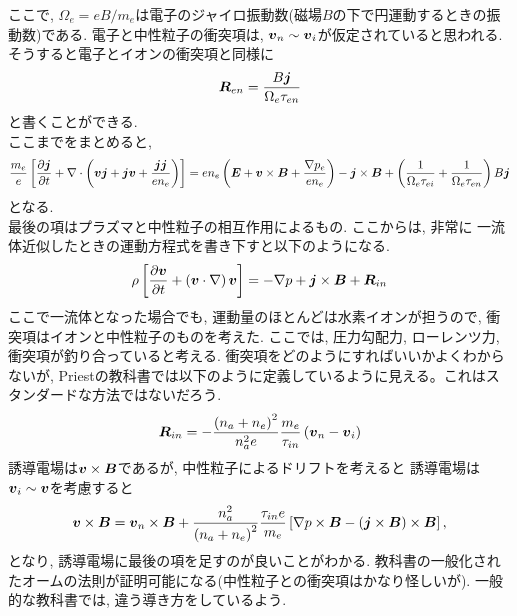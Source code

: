 \documentclass[12pt,a4j]{ltjarticle}
\newcommand{\bm}[1]{{\mbox{\boldmath $#1$}}}
\begin{document}
    ここで, $\Omega_e=eB/m_e$は電子のジャイロ振動数(磁場$B$の下で円運動するときの振動数)である.
    電子と中性粒子の衝突項は, $\bm{v}_n\sim\bm{v}_i$が仮定されていると思われる. そうすると電子とイオンの衝突項と同様に
    \begin{align}
        \bm{R}_{en} = \frac{B\bm{j}}{\Omega_e \tau_{en}}
    \end{align}
    と書くことができる.
    \\
    ここまでをまとめると,
    \begin{align}
        \frac{m_e}{e}
        \left[
        \frac{\partial\bm{j}}{\partial t} + \nabla\cdot\left(\bm{vj}+\bm{jv} + \frac{\bm{jj}}{en_e}\right)
        \right] = en_e\left(\bm{E}+\bm{v}\times\bm{B} + \frac{\nabla p_e}{en_e}\right) - \bm{j}\times\bm{B}
        +
        \left(
        \frac{1}{\Omega_e\tau_{ei}} + \frac{1}{\Omega_e\tau_{en}}
        \right)B\bm{j}
    \end{align}
    となる.\\
    最後の項はプラズマと中性粒子の相互作用によるもの. ここからは, 非常に
    一流体近似したときの運動方程式を書き下すと以下のようになる.
    \begin{align}
        \rho\left[
        \frac{\partial \bm{v}}{\partial t} + 
        \left(
            \bm{v}\cdot\nabla
        \right)\bm{v}
        \right] = -\nabla p + \bm{j}\times\bm{B} + \bm{R}_{in}
    \end{align}
    ここで一流体となった場合でも, 運動量のほとんどは水素イオンが担うので, 衝突項はイオンと中性粒子のものを考えた.
    ここでは, 圧力勾配力, ローレンツ力, 衝突項が釣り合っていると考える.
    衝突項をどのようにすればいいかよくわからないが, Priestの教科書では以下のように定義しているように見える。これはスタンダードな方法ではないだろう.
    \begin{align}
        \bm{R}_{in} = -\frac{\left(n_a+n_e\right)^2}{n_a^2e}\frac{m_e}{\tau_{in}}
        \left(\bm{v}_n - \bm{v}_i\right)
    \end{align}
    誘導電場は$\bm{v}\times\bm{B}$であるが, 中性粒子によるドリフトを考えると
    誘導電場は$\bm{v}_i\sim\bm{v}$を考慮すると
    \begin{align}
        \bm{v}\times\bm{B} = \bm{v}_n\times\bm{B} + \frac{n_a^2}{\left(n_a + n_e\right)^2}\frac{\tau_{in} e}{m_e}\left[\nabla p\times\bm{B} - \left(\bm{j}\times\bm{B}\right)\times\bm{B}\right],
    \end{align}
    となり, 誘導電場に最後の項を足すのが良いことがわかる. 教科書の一般化されたオームの法則が証明可能になる(中性粒子との衝突項はかなり怪しいが). 一般的な教科書では, 違う導き方をしているよう.
\end{document}
